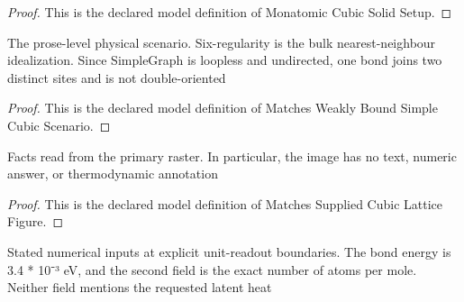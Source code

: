 \begin{proof}
  This is the declared model definition of Monatomic Cubic Solid Setup.
\end{proof}
\begin{definition}
  \label{def:physics:phyx-mini-0625:phyxminiproblems-problemphyxmini0625-matchesweaklyboundsimplecubicscenario}
  The prose-level physical scenario. Six-regularity is the bulk nearest-neighbour idealization. Since SimpleGraph is loopless and undirected, one bond joins two distinct sites and is not double-oriented
\end{definition}
\begin{proof}
  This is the declared model definition of Matches Weakly Bound Simple Cubic Scenario.
\end{proof}
\begin{definition}
  \label{def:physics:phyx-mini-0625:phyxminiproblems-problemphyxmini0625-matchessuppliedcubiclatticefigure}
  Facts read from the primary raster. In particular, the image has no text, numeric answer, or thermodynamic annotation
\end{definition}
\begin{proof}
  This is the declared model definition of Matches Supplied Cubic Lattice Figure.
\end{proof}
\begin{definition}
  \label{def:physics:phyx-mini-0625:phyxminiproblems-problemphyxmini0625-hasstatedbondandmolecalibrations}
  Stated numerical inputs at explicit unit-readout boundaries. The bond energy is 3.4 * 10⁻³ eV, and the second field is the exact number of atoms per mole. Neither field mentions the requested latent heat
\end{definition}
